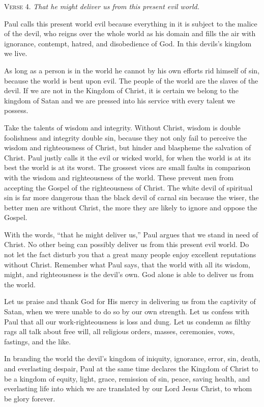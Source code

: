\textsc{Verse} 4. \emph{That he might deliver us from this present evil world.}

Paul calls this present world evil because everything in it is subject to the malice of the devil, who reigns over the whole world as his domain and fills the air with ignorance, contempt, hatred, and disobedience of God. In this devils’s kingdom we live.

As long as a person is in the world he cannot by his own efforts rid himself of sin, because the world is bent upon evil. The people of the world are the slaves of the devil. If we are not in the Kingdom of Christ, it is certain we belong to the kingdom of Satan and we are pressed into his service with every talent we possess.

Take the talents of wisdom and integrity. Without Christ, wisdom is double foolishness and integrity double sin, because they not only fail to perceive the wisdom and righteousness of Christ, but hinder and blaspheme the salvation of Christ. Paul justly calls it the evil or wicked world, for when the world is at its best the world is at its worst. The grossest vices are small faults in comparison with the wisdom and righteousness of the world. These prevent men from accepting the Gospel of the righteousness of Christ. The white devil of spiritual sin is far more dangerous than the black devil of carnal sin because the wiser, the better men are without Christ, the more they are likely to ignore and oppose the Gospel.

With the words, “that he might deliver us,” Paul argues that we stand in need of Christ. No other being can possibly deliver us from this present evil world. Do not let the fact disturb you that a great many people enjoy excellent reputations without Christ. Remember what Paul says, that the world with all its wisdom, might, and righteousness is the devil’s own. God alone is able to deliver us from the world.

Let us praise and thank God for His mercy in delivering us from the captivity of Satan, when we were unable to do so by our own strength. Let us confess with Paul that all our work-righteousness is loss and dung. Let us condemn as filthy rags all talk about free will, all religious orders, masses, ceremonies, vows, fastings, and the like.

In branding the world the devil’s kingdom of iniquity, ignorance, error, sin, death, and everlasting despair, Paul at the same time declares the Kingdom of Christ to be a kingdom of equity, light, grace, remission of sin, peace, saving health, and everlasting life into which we are translated by our Lord Jesus Christ, to whom be glory forever.

